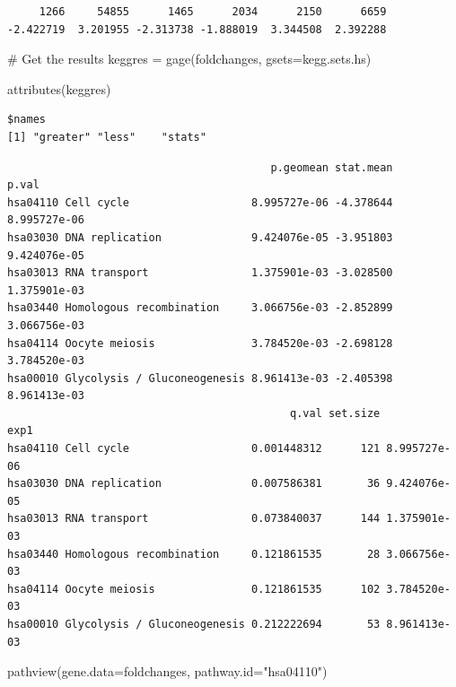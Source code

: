 \documentclass[
  letterpaper,
  DIV=11,
  numbers=noendperiod]{scrartcl}
\newenvironment{Shaded}{\begin{snugshade}}{\end{snugshade}}
\newcommand{\AttributeTok}[1]{\textcolor[rgb]{0.40,0.45,0.13}{#1}}
\newcommand{\CommentTok}[1]{\textcolor[rgb]{0.37,0.37,0.37}{#1}}
\newcommand{\FunctionTok}[1]{\textcolor[rgb]{0.28,0.35,0.67}{#1}}
\newcommand{\NormalTok}[1]{\textcolor[rgb]{0.00,0.23,0.31}{#1}}
\newcommand{\OtherTok}[1]{\textcolor[rgb]{0.00,0.23,0.31}{#1}}
\newcommand{\SpecialCharTok}[1]{\textcolor[rgb]{0.37,0.37,0.37}{#1}}
\newcommand{\StringTok}[1]{\textcolor[rgb]{0.13,0.47,0.30}{#1}}
\begin{document}
\begin{verbatim}
     1266     54855      1465      2034      2150      6659 
-2.422719  3.201955 -2.313738 -1.888019  3.344508  2.392288 
\end{verbatim}

\begin{Shaded}
\begin{Highlighting}[]
\CommentTok{\# Get the results}
\NormalTok{keggres }\OtherTok{=} \FunctionTok{gage}\NormalTok{(foldchanges, }\AttributeTok{gsets=}\NormalTok{kegg.sets.hs)}

\FunctionTok{attributes}\NormalTok{(keggres)}
\end{Highlighting}
\end{Shaded}

\begin{verbatim}
$names
[1] "greater" "less"    "stats"  
\end{verbatim}

\begin{Shaded}
\end{Shaded}

\begin{verbatim}
                                         p.geomean stat.mean        p.val
hsa04110 Cell cycle                   8.995727e-06 -4.378644 8.995727e-06
hsa03030 DNA replication              9.424076e-05 -3.951803 9.424076e-05
hsa03013 RNA transport                1.375901e-03 -3.028500 1.375901e-03
hsa03440 Homologous recombination     3.066756e-03 -2.852899 3.066756e-03
hsa04114 Oocyte meiosis               3.784520e-03 -2.698128 3.784520e-03
hsa00010 Glycolysis / Gluconeogenesis 8.961413e-03 -2.405398 8.961413e-03
                                            q.val set.size         exp1
hsa04110 Cell cycle                   0.001448312      121 8.995727e-06
hsa03030 DNA replication              0.007586381       36 9.424076e-05
hsa03013 RNA transport                0.073840037      144 1.375901e-03
hsa03440 Homologous recombination     0.121861535       28 3.066756e-03
hsa04114 Oocyte meiosis               0.121861535      102 3.784520e-03
hsa00010 Glycolysis / Gluconeogenesis 0.212222694       53 8.961413e-03
\end{verbatim}

\begin{Shaded}
\begin{Highlighting}[]
\FunctionTok{pathview}\NormalTok{(}\AttributeTok{gene.data=}\NormalTok{foldchanges, }\AttributeTok{pathway.id=}\StringTok{"hsa04110"}\NormalTok{)}
\end{Highlighting}
\end{Shaded}
\end{document}
